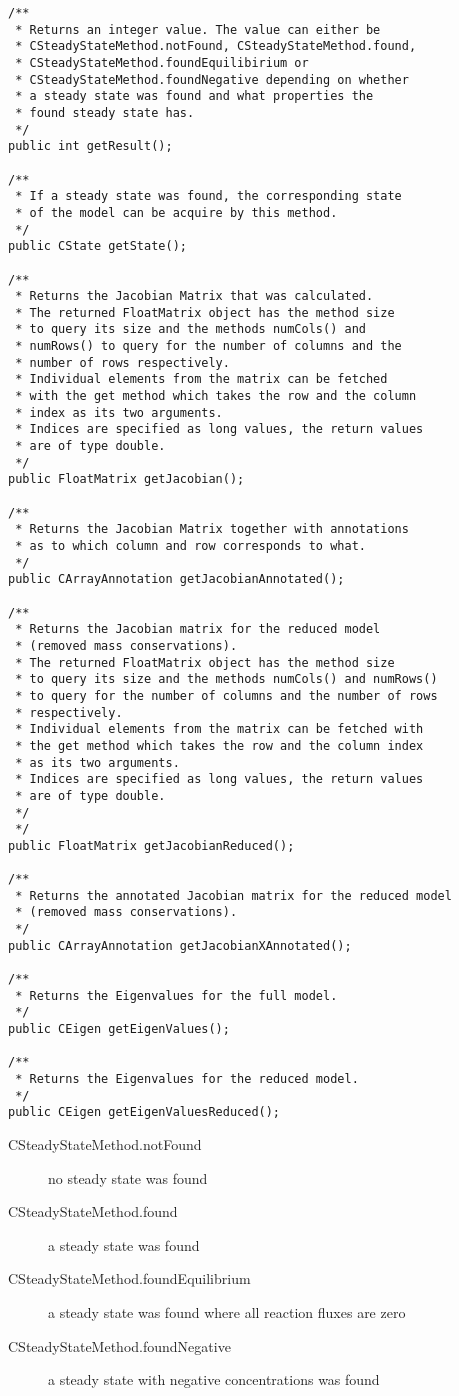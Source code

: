\documentclass[a4,10pt]{article}
\begin{document}
\begin{lstlisting}
/**
 * Returns an integer value. The value can either be
 * CSteadyStateMethod.notFound, CSteadyStateMethod.found,
 * CSteadyStateMethod.foundEquilibirium or
 * CSteadyStateMethod.foundNegative depending on whether 
 * a steady state was found and what properties the 
 * found steady state has.
 */
public int getResult();

/**
 * If a steady state was found, the corresponding state
 * of the model can be acquire by this method.
 */
public CState getState();

/**
 * Returns the Jacobian Matrix that was calculated.
 * The returned FloatMatrix object has the method size
 * to query its size and the methods numCols() and 
 * numRows() to query for the number of columns and the
 * number of rows respectively.
 * Individual elements from the matrix can be fetched
 * with the get method which takes the row and the column
 * index as its two arguments.
 * Indices are specified as long values, the return values
 * are of type double.
 */
public FloatMatrix getJacobian();

/**
 * Returns the Jacobian Matrix together with annotations
 * as to which column and row corresponds to what.
 */
public CArrayAnnotation getJacobianAnnotated();

/**
 * Returns the Jacobian matrix for the reduced model 
 * (removed mass conservations).
 * The returned FloatMatrix object has the method size
 * to query its size and the methods numCols() and numRows()
 * to query for the number of columns and the number of rows
 * respectively.
 * Individual elements from the matrix can be fetched with 
 * the get method which takes the row and the column index
 * as its two arguments.
 * Indices are specified as long values, the return values
 * are of type double.
 */
 */
public FloatMatrix getJacobianReduced();

/**
 * Returns the annotated Jacobian matrix for the reduced model 
 * (removed mass conservations).
 */
public CArrayAnnotation getJacobianXAnnotated();

/**
 * Returns the Eigenvalues for the full model.
 */
public CEigen getEigenValues();

/**
 * Returns the Eigenvalues for the reduced model.
 */
public CEigen getEigenValuesReduced();
\end{lstlisting}

\begin{description}
\item[CSteadyStateMethod.notFound]{no steady state was found}
\item[CSteadyStateMethod.found]{a steady state was found}
\item[CSteadyStateMethod.foundEquilibrium]{a steady state was found where all reaction fluxes are zero}
\item[CSteadyStateMethod.foundNegative]{a steady state with negative concentrations was found}
\end{description}
\end{document}
